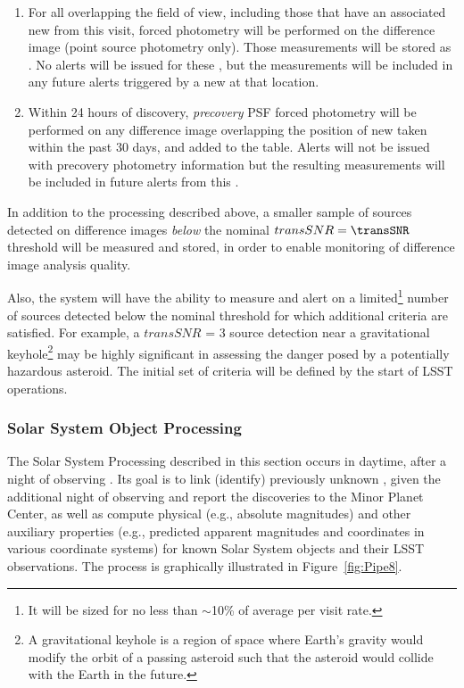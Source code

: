 \begin{enumerate}
\item For all \DIAObjects overlapping the field of view, including those that have an associated
new \DIASource from this visit, forced photometry will be performed on the difference image (point source photometry only). Those measurements will be stored as \DIAForcedSources.  No alerts will be issued for these \DIAForcedSources, but the \DIAForcedSource measurements will be included in any future alerts triggered by a new \DIASource at that location.
\item Within 24 hours of discovery, \emph{precovery} PSF forced photometry will be performed on any difference image overlapping the position of new \DIAObjects taken within the past 30 days, and added to the \DIAForcedSource table. Alerts will not be issued with precovery photometry information but the resulting \DIAForcedSource measurements will be included in future alerts from this \DIAObject.
\end{enumerate}

In addition to the processing described above, a smaller sample of sources detected on difference images \emph{below} the nominal $transSNR = \transSNR$  threshold will be measured and stored, in order to enable monitoring of difference image analysis quality.

Also, the system will have the ability to measure and alert on a limited\footnote{It will be sized for no less than $\sim$10\% of average \DIASource per visit rate.} number of sources detected below the nominal threshold for which additional criteria are satisfied. For example, a $transSNR$ = 3 source detection near a gravitational keyhole\footnote{
A gravitational keyhole is a region of space where Earth's gravity would modify the orbit of a passing asteroid
such that the asteroid would collide with the Earth in the future.}
may be highly significant in assessing the danger posed by a potentially hazardous asteroid.
The initial set of criteria will be defined by the start of LSST operations.

\subsubsection{Solar System Object Processing}
\label{sec:ssProcessing}

The Solar System Processing described in this section occurs in daytime, after a night of observing . Its goal is to link (identify) previously unknown \SSObjects, given the additional night of observing and report the discoveries to the Minor Planet Center, as well as compute physical (e.g., absolute magnitudes) and other auxiliary properties (e.g., predicted apparent magnitudes and coordinates in various coordinate systems) for known Solar System objects and their LSST observations. The process is graphically illustrated in Figure~\ref{fig:Pipe8}.

